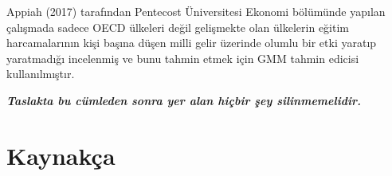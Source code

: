 \documentclass[
  12pt,
]{article}
\newlength{\cslhangindent}
\newlength{\cslentryspacingunit} %
\newenvironment{CSLReferences}[2] %
 {%
  \setlength{\parindent}{0pt}
  \ifodd #1
  \let\oldpar\par
  \def\par{\hangindent=\cslhangindent\oldpar}
  \fi
  \setlength{\parskip}{#2\cslentryspacingunit}
 }%
 {}
\begin{document}
Appiah (2017) tarafından Pentecost Üniversitesi Ekonomi bölümünde yapılan çalışmada sadece OECD ülkeleri değil gelişmekte olan ülkelerin eğitim harcamalarının kişi başına düşen milli gelir üzerinde olumlu bir etki yaratıp yaratmadığı incelenmiş ve bunu tahmin etmek için GMM tahmin edicisi kullanılmıştır.

\textbf{\emph{Taslakta bu cümleden sonra yer alan hiçbir şey silinmemelidir.}}

\newpage

\hypertarget{references}{%
\section{Kaynakça}\label{references}}

\hypertarget{refs}{}
\begin{CSLReferences}{0}{0}
\end{CSLReferences}
\end{document}
